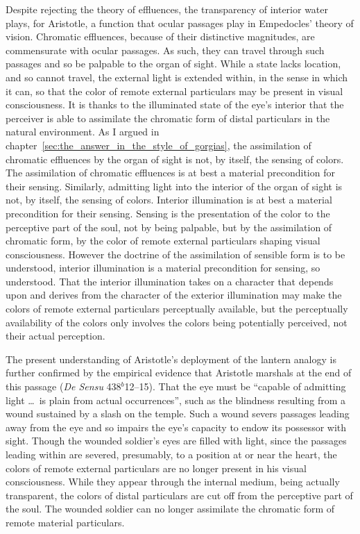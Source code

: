Despite rejecting the theory of effluences, the transparency of interior water plays, for Aristotle, a function that ocular passages play in Empedocles' theory of vision. Chromatic effluences, because of their distinctive magnitudes, are commensurate with ocular passages. As such, they can travel through such passages and so be palpable to the organ of sight. While a state lacks location, and so cannot travel, the external light is extended within, in the sense in which it can, so that the color of remote external particulars may be present in visual consciousness. It is thanks to the illuminated state of the eye's interior that the perceiver is able to assimilate the chromatic form of distal particulars in the natural environment. As I argued in chapter~\ref{sec:the_answer_in_the_style_of_gorgias}, the assimilation of chromatic effluences by the organ of sight is not, by itself, the sensing of colors. The assimilation of chromatic effluences is at best a material precondition for their sensing. Similarly, admitting light into the interior of the organ of sight is not, by itself, the sensing of colors. Interior illumination is at best a material precondition for their sensing. Sensing is the presentation of the color to the perceptive part of the soul, not by being palpable, but by the assimilation of chromatic form, by the color of remote external particulars shaping visual consciousness. However the doctrine of the assimilation of sensible form is to be understood, interior illumination is a material precondition for sensing, so understood. That the interior illumination takes on a character that depends upon and derives from the character of the exterior illumination may make the colors of remote external particulars perceptually available, but the perceptually availability of the colors only involves the colors being potentially perceived, not their actual perception.  


The present understanding of Aristotle's deployment of the lantern analogy is further confirmed by the empirical evidence that Aristotle marshals at the end of this passage (\emph{De Sensu} 438\( ^{b} \)12--15). That the eye must be ``capable of admitting light \ldots\ is plain from actual occurrences'', such as the blindness resulting from a wound sustained by a slash on the temple. Such a wound severs passages leading away from the eye and so impairs the eye's capacity to endow its possessor with sight. Though the wounded soldier's eyes are filled with light, since the passages leading within are severed, presumably, to a position at or near the heart, the colors of remote external particulars are no longer present in his visual consciousness. While they appear through the internal medium, being actually transparent, the colors of distal particulars are cut off from the perceptive part of the soul. The wounded soldier can no longer assimilate the chromatic form of remote material particulars.

